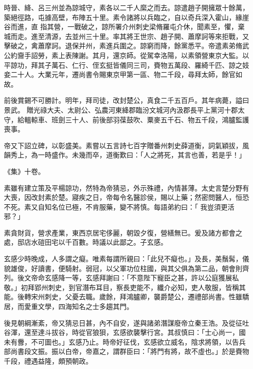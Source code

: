 \begin{pinyinscope}
 時晉、絳、呂三州並為諒城守，素各以二千人縻之而去。諒遣趙子開擁眾十餘萬，築絕徑路，屯據高壁，布陣五十里。素令諸將以兵臨之，自以奇兵深入霍山，緣崖谷而進，直
 指其營，一戰破之，諒所署介州刺史梁脩羅屯介休，聞素至，懼，棄城而走。進至清源，去並州三十里。率其將王世宗、趙子開、蕭摩訶等來拒戰，又擊破之，禽蕭摩訶。退保并州，素進兵圍之。諒窮而降，餘黨悉平。帝遣素弟脩武公約齎手詔勞，素上表陳謝。其月，還京師。從駕幸洛陽，以素領營東京大監。以平諒功，拜其子萬石、仁行、侄玄挺皆儀同三司，賚物五萬段、羅綺千匹、諒之妓妾二十人。大業元年，遷尚書令賜東京甲第一區、物二千段，尋拜太師，餘官如故。



 前後賞錫不可勝計。明年，拜司徒，改封楚公，真食二千五百戶。其年病薨，謚曰景武。
 贈光祿大夫、太尉公、弘農河東絳郡臨汾文城河內汲郡長平上黨河十郡太守，給轀輬車、班劍三十人、前後部羽葆鼓吹、粟麥五千石、物五千段，鴻臚監護喪事。



 帝又下詔立碑，以彰盛美。素嘗以五言詩七百字贈番州刺史薛道衡，詞氣穎拔，風韻秀上，為一時盛作。未幾而卒，道衡歎曰：「人之將死，其言也善，若是乎！」



 《集》十卷。



 素雖有建立策及平楊諒功，然特為帝猜忌，外示殊禮，內情甚薄。太史言楚分野有大喪，因改封素於楚。寢疾之日，帝每令名醫診侯，賜以上藥；然密問醫人，恒恐不死。素又自知名位已極，不肯服藥，變不將慎。每語弟約曰：「
 我豈須更活邪？」



 素貪財貨，營求產業，東西京居宅侈麗，朝毀夕復，營繕無已。爰及諸方都會之處，邸店水磑田宅以千百數。時議以此鄙之。子玄感。



 玄感少時晚成，人多謂之癡。唯素每謂所親曰：「此兒不癡也。」及長，美鬚髯，儀貌雄俊，好讀書，便騎射。弱冠，以父軍功位柱國，與其父俱為第二品，朝會則齊列。後文帝命玄感降一等，玄感拜謝曰：「不意陛下寵臣之甚，許以公庭獲展私敬。」初拜郢州刺史，到官潛布耳目，察長吏能不，纖介必知，吏人敬服，皆稱其能。後轉宋州刺史，父憂去職。歲餘，拜鴻臚卿，襲爵楚公，遷禮部尚書。性雖驕
 居，而愛重文學，四海知名之士多趨其門。



 後見朝綱漸紊，帝又猜忌日甚，內不自安，遂與諸弟潛謀廢帝立秦王浩。及從征吐谷渾，還至達斗拔谷，時從官狼狽，玄感欲襲擊行宮。其叔慎曰：「士心尚一，國未有釁，不可圖也。」玄感乃止。時帝好征伐，玄感欲立威名，陰求將領，以告兵部尚書段文振。振以白帝，帝嘉之，謂群臣曰：「將門有將，故不虛也。」於是賚物千段，禮遇益隆，頗預朝政。




\end{pinyinscope}
